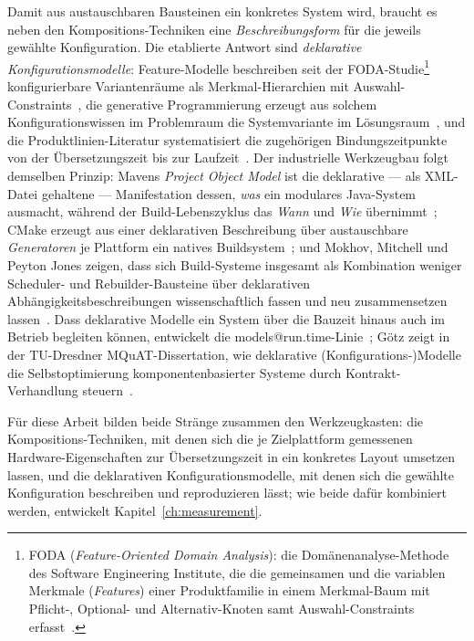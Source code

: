 \begin{nurlang}
Damit aus austauschbaren Bausteinen ein konkretes System wird, braucht es neben den
Kompositions-Techniken eine \emph{Beschreibungsform} für die jeweils gewählte Konfiguration. Die
etablierte Antwort sind \emph{deklarative Konfigurationsmodelle}: Feature-Modelle beschreiben seit
der FODA-Studie\footnote{FODA (\emph{Feature-Oriented Domain Analysis}): die Domänenanalyse-Methode des
Software Engineering Institute, die die gemeinsamen und die variablen Merkmale (\emph{Features}) einer
Produktfamilie in einem Merkmal-Baum mit Pflicht-, Optional- und Alternativ-Knoten samt
Auswahl-Constraints erfasst~\cite{kang1990foda}.} konfigurierbare Variantenräume als Merkmal-Hierarchien mit
Auswahl-Constraints~\cite{kang1990foda}, die generative Programmierung erzeugt aus solchem
Konfigurationswissen im Problemraum die Systemvariante im
Lösungsraum~\cite{czarnecki2000generative}, und die Produktlinien-Literatur systematisiert die
zugehörigen Bindungszeitpunkte von der Übersetzungszeit bis zur Laufzeit~\cite{apel2013feature}. Der
industrielle Werkzeugbau folgt demselben Prinzip: Mavens \emph{Project Object Model} ist die
deklarative --- als XML-Datei gehaltene --- Manifestation dessen, \emph{was} ein modulares
Java-System ausmacht, während der Build-Lebenszyklus das \emph{Wann} und \emph{Wie}
übernimmt~\cite{maven_pom}; CMake erzeugt aus einer deklarativen Beschreibung über austauschbare
\emph{Generatoren} je Plattform ein natives Buildsystem~\cite{cmake_manual}; und Mokhov, Mitchell
und Peyton Jones zeigen, dass sich Build-Systeme insgesamt als Kombination weniger Scheduler- und
Rebuilder-Bausteine über deklarativen Abhängigkeitsbeschreibungen wissenschaftlich fassen und neu
zusammensetzen lassen~\cite{mokhov2018build}. Dass deklarative Modelle ein System über die Bauzeit
hinaus auch im Betrieb begleiten können, entwickelt die
models@run.time-Linie~\cite{blair2009modelsruntime}; Götz zeigt in der TU-Dresdner
MQuAT-Dissertation, wie deklarative (Konfigurations-)Modelle die Selbstoptimierung
komponentenbasierter Systeme durch Kontrakt-Verhandlung steuern~\cite{goetz2013mqat}.

Für diese Arbeit bilden beide Stränge zusammen den Werkzeugkasten: die Kompositions-Techniken, mit
denen sich die je Zielplattform gemessenen Hardware-Eigenschaften zur Übersetzungszeit in ein
konkretes Layout umsetzen lassen, und die deklarativen Konfigurationsmodelle, mit denen sich die
gewählte Konfiguration beschreiben und reproduzieren lässt; wie beide dafür kombiniert werden,
entwickelt Kapitel~\ref{ch:measurement}.
\end{nurlang}
